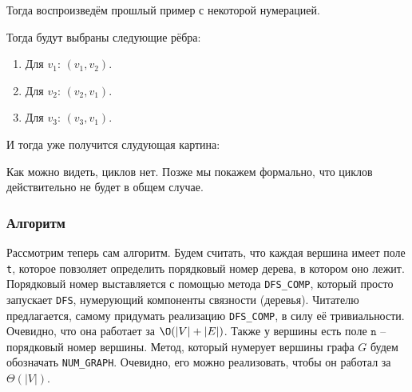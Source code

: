 Тогда воспроизведём прошлый пример с некоторой нумерацией.

\begin{figure}[H]
    \centering
\end{figure}

Тогда будут выбраны следующие рёбра:
\begin{enumerate}
    \item Для $v_1$: $(v_1, v_2)$.
    \item Для $v_2$: $(v_2, v_1)$.
    \item Для $v_3$: $(v_3, v_1)$.
\end{enumerate}
И тогда уже получится слудующая картина:

\begin{figure}[H]
    \centering
\end{figure}

Как можно видеть, циклов нет. Позже мы покажем формально, что циклов действительно не будет в общем случае.

\subsubsection{Алгоритм}

Рассмотрим теперь сам алгоритм. Будем считать, что каждая вершина имеет поле \texttt{t}, которое повзоляет определить порядковый номер дерева, в котором оно лежит.
Порядковый номер выставляется с помощью метода \texttt{DFS\_COMP}, который просто запускает \texttt{DFS}, нумерующий компоненты связности (деревья).
Читателю предлагается, самому придумать реализацию \texttt{DFS\_COMP}, в силу её тривиальности. Очевидно, что она работает за $\O(|V| + |E|)$.
Также у вершины есть поле $\texttt{n}$ -- порядковый номер вершины. Метод, который нумерует вершины графа $G$ будем обозначать \texttt{NUM\_GRAPH}. 
Очевидно, его можно реализовать, чтобы он работал за $\Theta(|V|)$.

